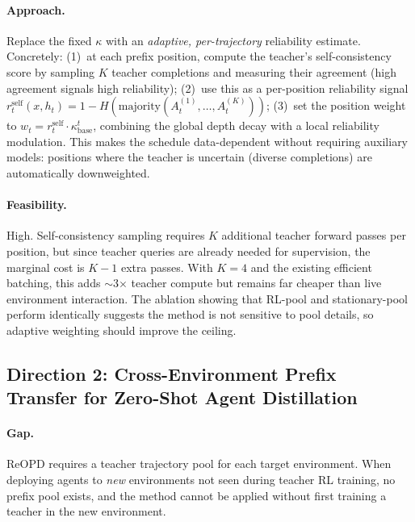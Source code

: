 \documentclass[11pt,a4paper]{article}
\begin{document}
\paragraph{Approach.}
Replace the fixed $\kappa$ with an \emph{adaptive, per-trajectory} reliability estimate. Concretely: (1)~at each prefix position, compute the teacher's self-consistency score by sampling $K$ teacher completions and measuring their agreement (high agreement signals high reliability); (2)~use this as a per-position reliability signal $r_t^{\text{self}}(x, h_t) = 1 - H(\text{majority}(A_t^{(1)}, \ldots, A_t^{(K)}))$; (3)~set the position weight to $w_t = r_t^{\text{self}} \cdot \kappa_{\text{base}}^t$, combining the global depth decay with a local reliability modulation. This makes the schedule data-dependent without requiring auxiliary models: positions where the teacher is uncertain (diverse completions) are automatically downweighted.

\paragraph{Feasibility.}
High. Self-consistency sampling requires $K$ additional teacher forward passes per position, but since teacher queries are already needed for supervision, the marginal cost is $K-1$ extra passes. With $K=4$ and the existing efficient batching, this adds $\sim$3$\times$ teacher compute but remains far cheaper than live environment interaction. The ablation showing that RL-pool and stationary-pool perform identically suggests the method is not sensitive to pool details, so adaptive weighting should improve the ceiling.

\subsection{Direction 2: Cross-Environment Prefix Transfer for Zero-Shot Agent Distillation}

\paragraph{Gap.}
ReOPD requires a teacher trajectory pool for each target environment. When deploying agents to \emph{new} environments not seen during teacher RL training, no prefix pool exists, and the method cannot be applied without first training a teacher in the new environment.
\end{document}
